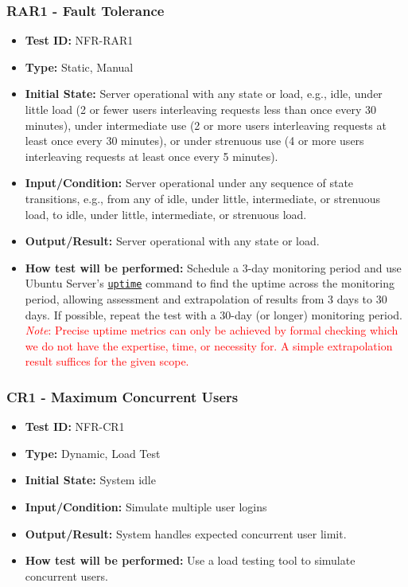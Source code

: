 \documentclass[12pt, titlepage]{article}
\begin{document}
\subsubsection{RAR1 - Fault Tolerance}
\begin{itemize}
    \item \textbf{Test ID:} NFR-RAR1
    \item \textbf{Type:} Static, Manual
    \item \textbf{Initial State:} Server operational with any state or load, e.g., idle, under little load (2 or fewer users interleaving requests less than once every 30 minutes), under intermediate use (2 or more users interleaving requests at least once every 30 minutes), or under strenuous use (4 or more users interleaving requests at least once every 5 minutes).
    \item \textbf{Input/Condition:} Server operational under any sequence of state transitions, e.g., from any of idle, under little, intermediate, or strenuous load, to idle, under little, intermediate, or strenuous load.
    \item \textbf{Output/Result:} Server operational with any state or load.
    \item \textbf{How test will be performed:} Schedule a 3-day monitoring period and use Ubuntu Server's \href{https://manpages.ubuntu.com/manpages/xenial/man1/uptime.1.html}{\texttt{uptime}} command to find the uptime across the monitoring period, allowing assessment and extrapolation of results from 3 days to 30 days. If possible, repeat the test with a 30-day (or longer) monitoring period. \textcolor{red}{\emph{Note}: Precise uptime metrics can only be achieved by formal checking which we do not have the expertise, time, or necessity for. A simple extrapolation result suffices for the given scope.}
\end{itemize}

\subsubsection{CR1 - Maximum Concurrent Users}
\begin{itemize}
    \item \textbf{Test ID:} NFR-CR1
    \item \textbf{Type:} Dynamic, Load Test
    \item \textbf{Initial State:} System idle
    \item \textbf{Input/Condition:} Simulate multiple user logins
    \item \textbf{Output/Result:} System handles expected concurrent user limit.
    \item \textbf{How test will be performed:} Use a load testing tool to simulate concurrent users.
\end{itemize}
\end{document}
